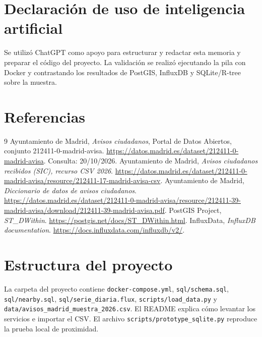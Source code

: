 \documentclass[a4paper,12pt]{article}
\begin{document}
\section{Declaración de uso de inteligencia artificial}
Se utilizó ChatGPT como apoyo para estructurar y redactar esta memoria y preparar el código del proyecto. La validación se realizó ejecutando la pila con Docker y contrastando los resultados de PostGIS, InfluxDB y SQLite/R-tree sobre la muestra.
\section{Referencias}
\begin{thebibliography}{9}
 Ayuntamiento de Madrid, \textit{Avisos ciudadanos}, Portal de Datos Abiertos, conjunto 212411-0-madrid-avisa. \url{https://datos.madrid.es/dataset/212411-0-madrid-avisa}. Consulta: 20/10/2026.
 Ayuntamiento de Madrid, \textit{Avisos ciudadanos recibidos (SIC), recurso CSV 2026}. \url{https://datos.madrid.es/dataset/212411-0-madrid-avisa/resource/212411-17-madrid-avisa-csv}.
 Ayuntamiento de Madrid, \textit{Diccionario de datos de avisos ciudadanos}. \url{https://datos.madrid.es/dataset/212411-0-madrid-avisa/resource/212411-39-madrid-avisa/download/212411-39-madrid-avisa.pdf}.
 PostGIS Project, \textit{ST\_DWithin}. \url{https://postgis.net/docs/ST_DWithin.html}.
 InfluxData, \textit{InfluxDB documentation}. \url{https://docs.influxdata.com/influxdb/v2/}.
\end{thebibliography}
\appendix
\section{Estructura del proyecto}
La carpeta del proyecto contiene \texttt{docker-compose.yml}, \texttt{sql/schema.sql}, \texttt{sql/nearby.sql}, \texttt{sql/serie\_diaria.flux}, \texttt{scripts/load\_data.py} y \texttt{data/avisos\_madrid\_muestra\_2026.csv}. El README explica cómo levantar los servicios e importar el CSV. El archivo \texttt{scripts/prototype\_sqlite.py} reproduce la prueba local de proximidad.
\end{document}
